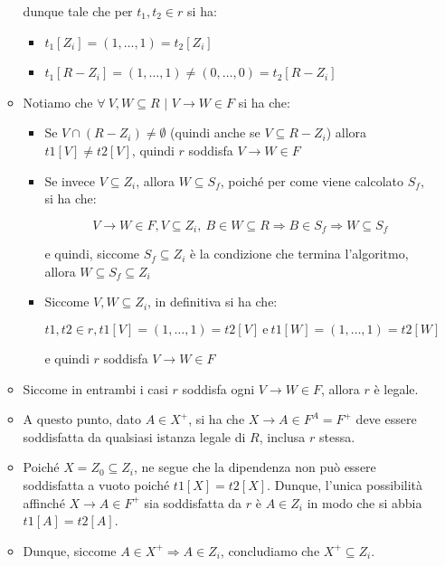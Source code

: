 \documentclass{article}
\begin{document}
\begin{itemize}
\begin{itemize}
  dunque tale che per $t_{1}, t_{2} \in r$ si ha:
  \begin{itemize}
    \item $t_{1}[Z_{i}] = (1, \dots, 1) = t_{2}[Z_{i}]$
    \item $t_{1}[R - Z_{i}] = (1, \dots, 1) \neq (0, \dots, 0) = t_{2}[R - Z_{i}]$
  \end{itemize}
    \item Notiamo che $\forall \ V, W \subseteq R$ $|$ $V \rightarrow W \in F$ si ha che:
    \begin{itemize}
      \item Se $V \cap (R - Z_i) \neq \emptyset$ (quindi anche se $V \subseteq R - Z_i$) allora $t1[V] \neq t2[V]$, quindi $r$ soddisfa $V \rightarrow W \in F$
      \item Se invece $V \subseteq Z_i$, allora $W \subseteq S_f$, poiché per come viene calcolato $S_f$, si ha che:\par

      \[ V \rightarrow W \in F, V \subseteq Z_i, \ B \in W \subseteq R \Rightarrow B \in S_f \Rightarrow W \subseteq S_f \]

      e quindi, siccome $S_f \subseteq Z_i$ è la condizione che termina l'algoritmo, allora $W \subseteq S_f \subseteq Z_i$
      \item Siccome $V, W \subseteq Z_i$, in definitiva si ha che:\par 
      \[t1, t2 \in r, t1[V] = (1, \dots, 1) = t2[V]\  \text{e} \ t1[W] = (1, \dots, 1) = t2[W]\]
      \par e quindi $r$ soddisfa $V \rightarrow W \in F$
    \end{itemize}
    \item Siccome in entrambi i casi $r$ soddisfa ogni $V \rightarrow W \in F$, allora $r$ è legale.
    \item A questo punto, dato $A \in X^+$, si ha che $X \rightarrow A \in F^A = F^+$ deve essere soddisfatta da qualsiasi istanza legale di $R$, inclusa $r$ stessa.
    \item Poiché $X = Z_0 \subseteq Z_i$, ne segue che la dipendenza non può essere soddisfatta a vuoto poiché $t1[X] = t2[X]$. Dunque, l'unica possibilità affinché $X \rightarrow A \in F^+$ sia soddisfatta da $r$ è $A \in Z_i$ in modo che si abbia $t1[A] = t2[A]$.
    \item Dunque, siccome $A \in X^+ \Rightarrow A \in Z_i$, concludiamo che $X^+ \subseteq Z_i$.
  
  \end{itemize}
\end{itemize}
\end{document}
